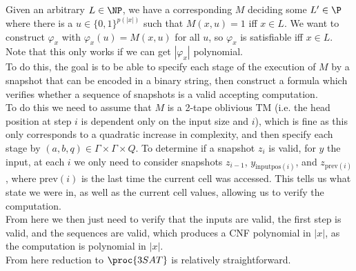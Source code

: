 \documentclass{tikzposter} %
\begin{document}
\begin{columns}
{{  Given an arbitrary $L \in \NP$, we have a corresponding $M$ deciding some $L' \in \P$ where there is a $u \in \{0,1\}^{p(|x|)}$ such that $M(x,u) = 1$ iff $x \in L$. We want to construct $\varphi_{x}$ with $\varphi_{x}(u) = M(x,u)$ for all $u$, so $\varphi_{x}$ is satisfiable iff $x \in L$. Note that this only works if we can get $|\varphi_{x}|$ polynomial. \\

  To do this, the goal is to be able to specify each stage of the execution of $M$ by a snapshot that can be encoded in a binary string, then construct a formula which verifies whether a sequence of snapshots is a valid accepting computation. \\

  To do this we need to assume that $M$ is a 2-tape oblivious TM (i.e. the head position at step $i$ is dependent only on the input size and $i$), which is fine as this only corresponds to a quadratic increase in complexity, and then specify each stage by $(a,b,q) \in \Gamma \times \Gamma \times Q$. To determine if a snapshot $z_{i}$ is valid, for $y$ the input, at each $i$ we only need to consider snapshots $z_{i-1}$, $y_{\mathrm{inputpos}(i)}$, and $z_{\mathrm{prev}(i)}$, where $\mathrm{prev}(i)$ is the last time the current cell was accessed. This tells us what state we were in, as well as the current cell values, allowing us to verify the computation. \\

  From here we then just need to verify that the inputs are valid, the first step is valid, and the sequences are valid, which produces a CNF polynomial in $|x|$, as the computation is polynomial in $|x|$. \\

  From here reduction to $\proc{3SAT}$ is relatively straightforward.

  }
}
\end{columns}
\end{document}
